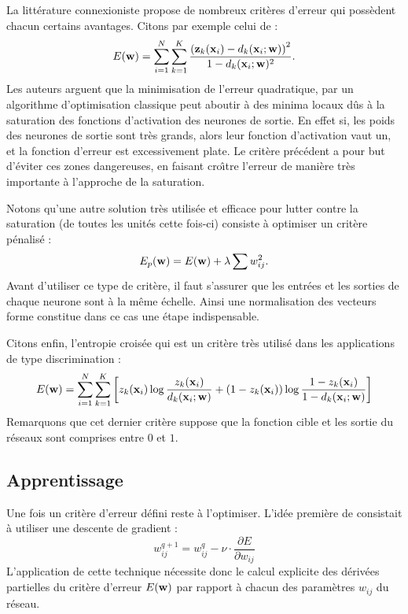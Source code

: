 La litt\'erature connexioniste propose de nombreux crit\`eres d'erreur
qui poss\`edent chacun certains avantages. Citons par exemple 
celui  de  :
$$
E(\mbox{\bf w})=\sum_{i=1}^N \sum_{k=1}^K \frac{\left( \mbox{\bf z}_k(\mbox{\bf x}_i) - d_k(\mbox{\bf x}_i ; \mbox{\bf w}) \right)^2}{1-
d_k(\mbox{\bf x}_i ; \mbox{\bf w})^2}.
$$
Les auteurs arguent que la minimisation de l'erreur quadratique, par un algorithme 
d'optimisation
classique peut aboutir \`a des minima locaux d\^us \`a la saturation des fonctions d'activation
des neurones de sortie. En effet si, les poids des neurones de sortie sont tr\`es grands, 
alors leur fonction d'activation vaut un, et la fonction d'erreur est excessivement plate. 
Le crit\`ere pr\'ec\'edent a pour but d'\'eviter ces zones dangereuses, en faisant cro\^{\i}tre
l'erreur de mani\`ere tr\`es importante \`a l'approche de la saturation. 

Notons qu'une  autre solution tr\`es utilis\'ee et efficace pour lutter contre la 
saturation (de toutes les unit\'es cette fois-ci) consiste \`a optimiser un crit\`ere
p\'enalis\'e :
$$
E_p(\mbox{\bf w})= E(\mbox{\bf w}) + \lambda \sum w_{ij}^2.
$$
Avant d'utiliser ce type de crit\`ere, il faut s'assurer que les entr\'ees et les
sorties de chaque neurone sont \`a la m\^eme \'echelle. Ainsi une normalisation
des vecteurs forme constitue dans ce cas  une \'etape indispensable.

Citons enfin, l'entropie crois\'ee qui est un crit\`ere tr\`es utilis\'e dans les applications 
de type discrimination :
$$
E(\mbox{\bf w})=\sum_{i=1}^N \sum_{k=1}^K \left 
[z_k(\mbox{\bf x}_i)\log\frac{z_k(\mbox{\bf x}_i)}{d_k(\mbox{\bf x}_i;\mbox{\bf w})}+(1- z_k(\mbox{\bf x}_i))
\log\frac{1-z_k(\mbox{\bf x}_i)}{1-d_k(\mbox{\bf x}_i;\mbox{\bf w})}   \right ]
$$
Remarquons que cet dernier crit\`ere suppose que la fonction cible et les sortie du r\'eseaux
sont comprises entre $0$ et $1$.
  




\subsection{Apprentissage}

Une fois un crit\`ere d'erreur d\'efini reste \`a l'optimiser. L'id\'ee premi\`ere
de  consistait \`a utiliser une descente de gradient :
$$
w_{ij}^ {q+1} = w_{ij}^ {q} - \nu \cdot \frac{\partial E}{\partial w_{ij}}
$$ 
L'application de cette technique n\'ecessite donc le calcul explicite 
des d\'eriv\'ees partielles du crit\`ere d'erreur $E(\mbox{\bf w})$ par rapport \`a chacun
des param\`etres $w_{ij}$ du r\'eseau. 

